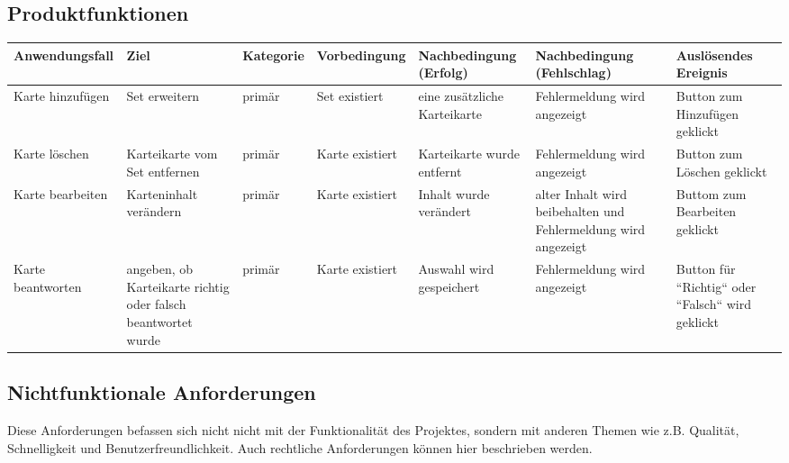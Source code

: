 \begin{landscape}
\begin{center}
\subsection{Produktfunktionen}


\begin{tabulary}{1.35\textwidth}{|L|L|L|L|L|L|L|}
\hline 
\textbf{Anwendungsfall} & \textbf{Ziel} & \textbf{Kategorie} & \textbf{Vorbedingung} & \textbf{Nachbedingung (Erfolg)} & \textbf{Nachbedingung (Fehlschlag)} & \textbf{Auslösendes Ereignis} \\ 
\hline 
Karte hinzufügen & Set erweitern & primär & Set existiert & eine zusätzliche Karteikarte & Fehlermeldung wird angezeigt & Button zum Hinzufügen geklickt \\ 
\hline 
Karte löschen & Karteikarte vom Set entfernen & primär & Karte existiert & Karteikarte wurde entfernt & Fehlermeldung wird angezeigt & Button zum Löschen geklickt \\ 
\hline 
Karte bearbeiten & Karteninhalt verändern & primär & Karte existiert & Inhalt wurde verändert & alter Inhalt wird beibehalten und Fehlermeldung wird angezeigt & Buttom zum Bearbeiten geklickt \\ 
\hline 
Karte beantworten & angeben, ob Karteikarte richtig oder falsch beantwortet wurde & primär & Karte existiert & Auswahl wird gespeichert & Fehlermeldung wird angezeigt & Button für ``Richtig`` oder ``Falsch`` wird geklickt \\ 
\hline 
\end{tabulary} 
\end{center}
\end{landscape}
\restoregeometry


\newpage
\subsection{Nichtfunktionale Anforderungen}
Diese Anforderungen befassen sich nicht nicht mit der Funktionalität des Projektes, sondern mit anderen Themen wie z.B. Qualität, Schnelligkeit und Benutzerfreundlichkeit. Auch rechtliche Anforderungen können hier beschrieben werden.

